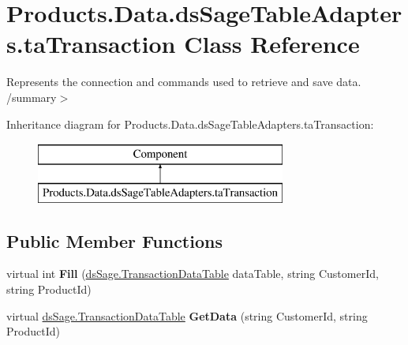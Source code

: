\hypertarget{class_products_1_1_data_1_1ds_sage_table_adapters_1_1ta_transaction}{}\section{Products.\+Data.\+ds\+Sage\+Table\+Adapters.\+ta\+Transaction Class Reference}
\label{class_products_1_1_data_1_1ds_sage_table_adapters_1_1ta_transaction}


Represents the connection and commands used to retrieve and save data. /summary$>$  


Inheritance diagram for Products.\+Data.\+ds\+Sage\+Table\+Adapters.\+ta\+Transaction\+:\begin{figure}[H]
\begin{center}
\leavevmode
\includegraphics[height=2.000000cm]{class_products_1_1_data_1_1ds_sage_table_adapters_1_1ta_transaction}
\end{center}
\end{figure}
\subsection*{Public Member Functions}
\begin{DoxyCompactItemize}
\item 
virtual int {\bfseries Fill} (\hyperlink{class_products_1_1_data_1_1ds_sage_1_1_transaction_data_table}{ds\+Sage.\+Transaction\+Data\+Table} data\+Table, string Customer\+Id, string Product\+Id)\hypertarget{class_products_1_1_data_1_1ds_sage_table_adapters_1_1ta_transaction_a04b15b4978e1d4b1b92c3649a9d0c8bf}{}\label{class_products_1_1_data_1_1ds_sage_table_adapters_1_1ta_transaction_a04b15b4978e1d4b1b92c3649a9d0c8bf}

\item 
virtual \hyperlink{class_products_1_1_data_1_1ds_sage_1_1_transaction_data_table}{ds\+Sage.\+Transaction\+Data\+Table} {\bfseries Get\+Data} (string Customer\+Id, string Product\+Id)\hypertarget{class_products_1_1_data_1_1ds_sage_table_adapters_1_1ta_transaction_a030e908b784014b0a2d9f499057f4a1a}{}\label{class_products_1_1_data_1_1ds_sage_table_adapters_1_1ta_transaction_a030e908b784014b0a2d9f499057f4a1a}

\end{DoxyCompactItemize}

